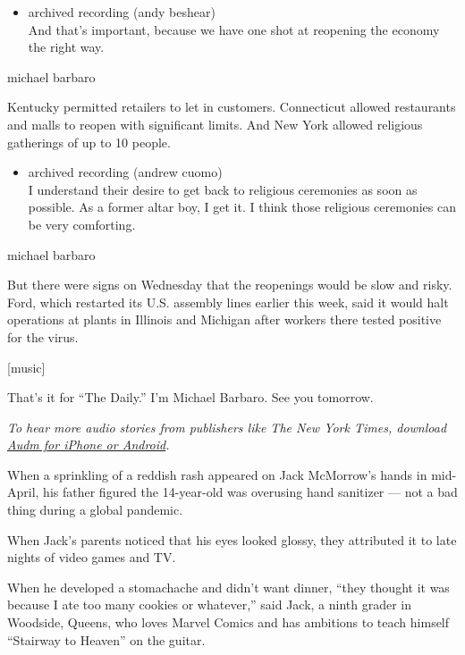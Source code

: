 \begin{itemize}
\tightlist
\item
  archived recording (andy beshear)\\
  And that's important, because we have one shot at reopening the
  economy the right way.
\end{itemize}

michael barbaro

Kentucky permitted retailers to let in customers. Connecticut allowed
restaurants and malls to reopen with significant limits. And New York
allowed religious gatherings of up to 10 people.

\begin{itemize}
\tightlist
\item
  archived recording (andrew cuomo)\\
  I understand their desire to get back to religious ceremonies as soon
  as possible. As a former altar boy, I get it. I think those religious
  ceremonies can be very comforting.
\end{itemize}

michael barbaro

But there were signs on Wednesday that the reopenings would be slow and
risky. Ford, which restarted its U.S. assembly lines earlier this week,
said it would halt operations at plants in Illinois and Michigan after
workers there tested positive for the virus.

{[}music{]}

That's it for ``The Daily.'' I'm Michael Barbaro. See you tomorrow.

\emph{To hear more audio stories from publishers like The New York
Times, download}
\href{https://www.audm.com/?utm_source=nyt\&utm_medium=embed\&utm_campaign=fire_in_veins}{\emph{Audm
for iPhone or Android}}\emph{.}

When a sprinkling of a reddish rash appeared on Jack McMorrow's hands in
mid-April, his father figured the 14-year-old was overusing hand
sanitizer --- not a bad thing during a global pandemic.

When Jack's parents noticed that his eyes looked glossy, they attributed
it to late nights of video games and TV.

When he developed a stomachache and didn't want dinner, ``they thought
it was because I ate too many cookies or whatever,'' said Jack, a ninth
grader in Woodside, Queens, who loves Marvel Comics and has ambitions to
teach himself ``Stairway to Heaven'' on the guitar.

